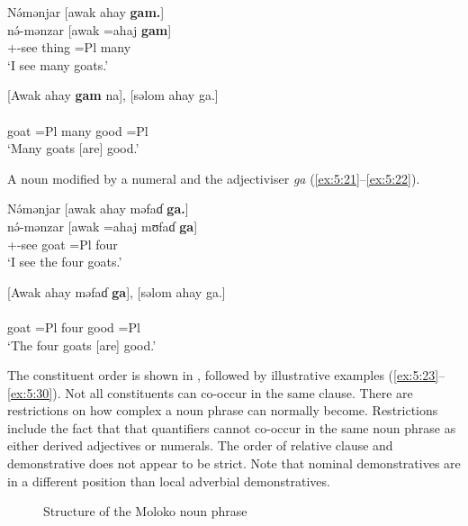 \ea \label{ex:5:19}
N\'{ə}mənjar  [awak  ahay  \textbf{gam.}]\\
\gll  n\'{ə}-mənzar  [awak  =ahaj  \textbf{gam}]\\
      {\oneS}+{\IFV}-see  thing  =Pl  many\\
\glt  ‘I see many goats.’
\z

\ea \label{ex:5:20}
{}[Awak  ahay  \textbf{gam}  na],  [səlom  ahay  ga.]\\
\gll  [awak   =ahaj   \textbf{gam}   na]   [sʊlɔm   =ahaj   ga]\\
      goat    =Pl  many  {\PSP}  good  =Pl  {\ADJ}\\
\glt  ‘Many goats [are] good.’
\z

A noun modified by a numeral and the adjectiviser \textit{ga} (\ref{ex:5:21}--\ref{ex:5:22}).

\ea \label{ex:5:21}
N\'{ə}mənjar  [awak  ahay  məfaɗ \textbf{ga.}]\\
\gll  n\'{ə}-mənzar  [awak  =ahaj  mʊfaɗ   \textbf{ga}]\\
      {\oneS}+{\IFV}-see  goat  =Pl  four  {\ADJ}\\
\glt  ‘I see the four goats.’
\z

\ea \label{ex:5:22}
{}[Awak  ahay  məfaɗ \textbf{ga}],  [səlom  ahay  ga.]\\
\gll  [awak   =ahaj   mʊfaɗ   \textbf{ga}]   [sʊlɔm   =ahaj   ga]\\
      goat    =Pl  four  {\ADJ}  good  =Pl  {\ADJ}\\
\glt  ‘The four goats [are] good.’
\z

The constituent order is shown in , followed by illustrative examples (\ref{ex:5:23}--\ref{ex:5:30}). Not all constituents can co-occur in the same clause. There are restrictions on how complex a noun phrase can normally become. Restrictions include the fact that that quantifiers cannot co-occur in the same noun phrase as either derived adjectives or numerals. The order of relative clause and demonstrative does not appear to be strict. Note that nominal demonstratives are in a different position than local adverbial demonstratives.

\begin{figure}
\caption{Structure of the Moloko noun phrase}\label{fig:8}
\end{figure}

